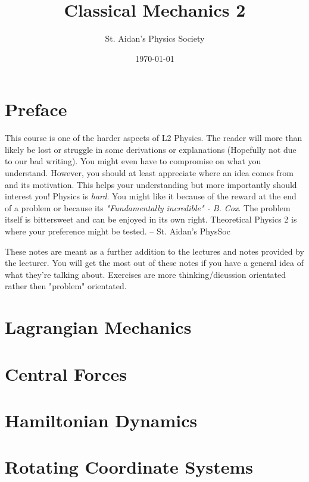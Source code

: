 \documentclass[10pt,%
               a4paper]{physics_notes}
\begin{document}
\title{Classical Mechanics 2}
\author{St. Aidan's Physics Society}
\date{\today}
\maketitle

\tableofcontents
\newpage

\section{Preface}
This course is one of the harder aspects of L2 Physics. The reader will more than likely be lost or struggle in some derivations or explanations (Hopefully not due to our bad writing). You might even have to compromise on what you understand. However, you should at least appreciate where an idea comes from and its motivation. This helps your understanding but more importantly should interest you! Physics is \textit{hard}. You might like it because of the reward at the end of a problem or because its \textit{"Fundamentally incredible" - B. Cox}. The problem itself is bittersweet and can be enjoyed in its own right.  Theoretical Physics 2 is where your preference might be tested. -- St. Aidan's PhysSoc\par



These notes are meant as a further addition to the lectures and notes provided by the lecturer. You will get the most out of these notes if you have a general idea of what they're talking about. Exercises are more thinking/dicussion orientated rather then "problem" orientated. 
\newpage

\section{Lagrangian Mechanics}



\section{Central Forces}


\section{Hamiltonian Dynamics}


\section{Rotating Coordinate Systems}


 
\end{document}
